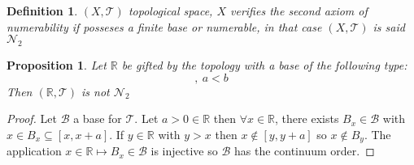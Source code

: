 \documentclass{article}
\newtheorem{proposition}{Proposition}
\newtheorem{definition}{Definition}
\begin{document}
    \newpage
    \begin{definition}
        $(X, \mathcal{T})$ topological space, $X$ verifies the second axiom of numerability if posseses a finite base or numerable, in that case $(X, \mathcal{T})$ is said $\mathcal{N}_2$
    \end{definition}
    \begin{proposition}
        Let $\mathbb{R}$ be gifted by the topology with a base of the following type: 
        \begin{equation*}
            [a,b], \ a < b    
        \end{equation*}
        Then $(\mathbb{R}, \mathcal{T})$ is not $\mathcal{N}_2$
    \end{proposition}
    \begin{proof}
        Let $\mathcal{B}$ a base for $\mathcal{T}$. Let $a > 0 \in \mathbb{R}$ then $\forall x  \in \mathbb{R}$, there exists $B_x \in \mathcal{B}$ with $x \in B_x \subseteq [x, x + a]$.
        If $y \in \mathbb{R}$ with $y > x$ then $x \notin [y, y + a]$ so $x \notin B_y$.
        The application $x\in \mathbb{R} \longmapsto B_x \in \mathcal{B}$  is injective so $ \mathcal{B}$ has the continuum order.    
    \end{proof}
\end{document}
